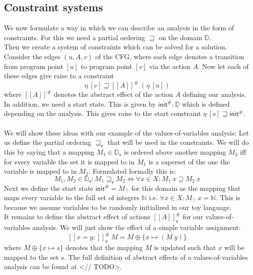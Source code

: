     \subsection{Constraint systems}
    We now formulate a way in which we can describe an analysis in the form of constraints. For this we need a partial ordering $\sqsupseteq$ on the domain $\mathbb{D}$.\\
    Then we create a system of constraints which can be solved for a solution. Consider the edges $(u, A, v)$ of the CFG, where each edge denotes a transition from program point $[u]$ to program point $[v]$ via the action $A$. Now let each of these edges give raise to a constraint
    \[\eta\ [v] \sqsupseteq [\![A]\!]^{\#}\ (\eta\ [u])\]
    where $[\![A]\!]^{\#}$ denotes the abstract effect of the action $A$ defining our analysis. In addition, we need a start state. This is given by $\textsf{init}^{\#}: \mathbb{D}$ which is defined depending on the analysis. This gives raise to the start constraint $\eta\ [s] \sqsupseteq \textsf{init}^{\#}$.\\
    \\
    We will show these ideas with our example of the values-of-variables analysis: Let us define the partial ordering $\sqsupseteq_\textsf{v}$ that will be used in the constraints. We will do this by saying that a mapping $M_1 \in \mathbb{D}_\textsf{v}$ is ordered above another mapping $M_2$ iff for every variable the set it is mapped to in $M_1$ is a superset of the one the variable is mapped to in $M_2$. Formulated formally this is:
    \[M_1, M_2 \in \mathbb{D}_\textsf{v}: M_1 \sqsupseteq_\textsf{v} M_2 \Longleftrightarrow \forall x \in X: M_1\ x \supseteq M_2\ x\]
    Next we define the start state $\textsf{init}^{\#} = M_\top$ for this domain as the mapping that maps every variable to the full set of integers $\mathbb{N}$ i.e. $\forall x \in X: M_\top\ x = \mathbb{N}$. This is because we assume variables to be randomly initialized in our toy language.\\
    It remains to define the abstract effect of actions $[\![A]\!]^{\#}_\textsf{v}$ for our values-of-variables analysis. We will just show the effect of a simple variable assignment:
    \[ [\![ x=y; ]\!]^{\#}_\textsf{v}\ M = M \oplus \{x \mapsto (M\ y) \} \]
    where $M \oplus \{x \mapsto s\}$ denotes that the mapping $M$ is updated such that $x$ will be mapped to the set $s$. The full definition of abstract effects of a values-of-variables analysis can be found at <// TODO>.\\


